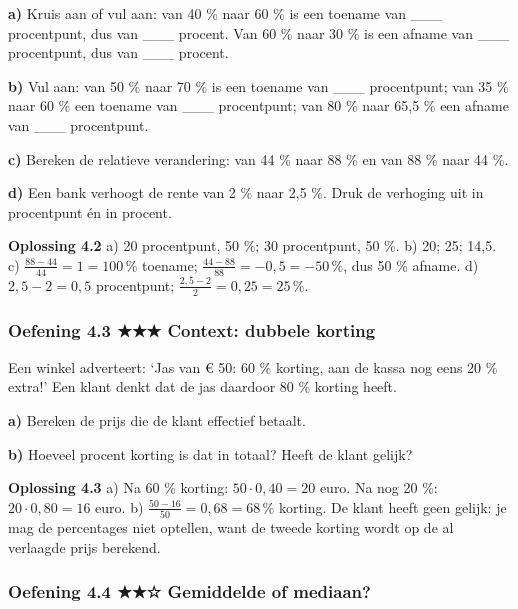 \textbf{a)} Kruis aan of vul aan: van 40 \% naar 60 \% is een toename van \_\_\_ procentpunt, dus van \_\_\_ procent. Van 60 \% naar 30 \% is een afname van \_\_\_ procentpunt, dus van \_\_\_ procent. \lijn

\textbf{b)} Vul aan: van 50 \% naar 70 \% is een toename van \_\_\_ procentpunt; van 35 \% naar 60 \% een toename van \_\_\_ procentpunt; van 80 \% naar 65,5 \% een afname van \_\_\_ procentpunt. \lijn

\textbf{c)} Bereken de relatieve verandering: van 44 \% naar 88 \% en van 88 \% naar 44 \%. \lijn

\textbf{d)} Een bank verhoogt de rente van 2 \% naar 2,5 \%. Druk de verhoging uit in procentpunt én in procent. \lijn

\begin{oplossing}
\textbf{Oplossing 4.2} \quad a) 20 procentpunt, 50 \%; 30 procentpunt, 50 \%. b) 20; 25; 14,5. c) $\frac{88-44}{44}=1=100\,\%$ toename; $\frac{44-88}{88}=-0{,}5=-50\,\%$, dus 50 \% afname. d) $2{,}5-2=0{,}5$ procentpunt; $\frac{2{,}5-2}{2}=0{,}25=25\,\%$.
\end{oplossing}

\subsubsection*{Oefening 4.3 \quad ★★★ \quad Context: dubbele korting}

Een winkel adverteert: ‘Jas van € 50: 60 \% korting, aan de kassa nog eens 20 \% extra!’ Een klant denkt dat de jas daardoor 80 \% korting heeft.

\textbf{a)} Bereken de prijs die de klant effectief betaalt. \lijn

\textbf{b)} Hoeveel procent korting is dat in totaal? Heeft de klant gelijk? \lijn

\begin{oplossing}
\textbf{Oplossing 4.3} \quad a) Na 60 \% korting: $50\cdot 0{,}40=20$ euro. Na nog 20 \%: $20\cdot 0{,}80=16$ euro. b) $\frac{50-16}{50}=0{,}68=68\,\%$ korting. De klant heeft geen gelijk: je mag de percentages niet optellen, want de tweede korting wordt op de al verlaagde prijs berekend.
\end{oplossing}

\subsubsection*{Oefening 4.4 \quad ★★☆ \quad Gemiddelde of mediaan?}

